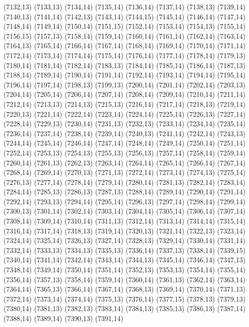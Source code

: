 (7132,13)
(7133,13)
(7134,14)
(7135,14)
(7136,14)
(7137,14)
(7138,13)
(7139,14)
(7140,13)
(7141,14)
(7142,13)
(7143,14)
(7144,15)
(7145,14)
(7146,14)
(7147,14)
(7148,14)
(7149,14)
(7150,14)
(7151,15)
(7152,14)
(7153,14)
(7154,13)
(7155,14)
(7156,15)
(7157,13)
(7158,14)
(7159,14)
(7160,14)
(7161,14)
(7162,14)
(7163,14)
(7164,13)
(7165,14)
(7166,14)
(7167,14)
(7168,14)
(7169,14)
(7170,14)
(7171,14)
(7172,14)
(7173,14)
(7174,14)
(7175,14)
(7176,14)
(7177,14)
(7178,14)
(7179,13)
(7180,14)
(7181,14)
(7182,14)
(7183,13)
(7184,14)
(7185,14)
(7186,14)
(7187,13)
(7188,14)
(7189,14)
(7190,14)
(7191,14)
(7192,14)
(7193,14)
(7194,14)
(7195,14)
(7196,14)
(7197,14)
(7198,13)
(7199,13)
(7200,14)
(7201,14)
(7202,14)
(7203,13)
(7204,14)
(7205,14)
(7206,14)
(7207,14)
(7208,14)
(7209,14)
(7210,14)
(7211,14)
(7212,14)
(7213,13)
(7214,13)
(7215,13)
(7216,14)
(7217,14)
(7218,13)
(7219,14)
(7220,13)
(7221,14)
(7222,14)
(7223,14)
(7224,14)
(7225,14)
(7226,13)
(7227,14)
(7228,14)
(7229,13)
(7230,14)
(7231,13)
(7232,13)
(7233,14)
(7234,14)
(7235,14)
(7236,14)
(7237,14)
(7238,14)
(7239,14)
(7240,13)
(7241,14)
(7242,14)
(7243,13)
(7244,14)
(7245,14)
(7246,14)
(7247,14)
(7248,14)
(7249,14)
(7250,14)
(7251,14)
(7252,14)
(7253,13)
(7254,13)
(7255,13)
(7256,13)
(7257,14)
(7258,14)
(7259,14)
(7260,14)
(7261,13)
(7262,13)
(7263,14)
(7264,14)
(7265,14)
(7266,14)
(7267,14)
(7268,14)
(7269,14)
(7270,13)
(7271,13)
(7272,14)
(7273,14)
(7274,13)
(7275,14)
(7276,13)
(7277,14)
(7278,14)
(7279,14)
(7280,14)
(7281,13)
(7282,14)
(7283,14)
(7284,14)
(7285,13)
(7286,13)
(7287,13)
(7288,14)
(7289,14)
(7290,14)
(7291,14)
(7292,14)
(7293,13)
(7294,14)
(7295,14)
(7296,13)
(7297,14)
(7298,14)
(7299,14)
(7300,13)
(7301,14)
(7302,14)
(7303,14)
(7304,14)
(7305,14)
(7306,14)
(7307,14)
(7308,14)
(7309,14)
(7310,14)
(7311,13)
(7312,14)
(7313,14)
(7314,14)
(7315,14)
(7316,14)
(7317,14)
(7318,13)
(7319,14)
(7320,13)
(7321,14)
(7322,13)
(7323,14)
(7324,14)
(7325,14)
(7326,13)
(7327,14)
(7328,13)
(7329,14)
(7330,14)
(7331,14)
(7332,14)
(7333,13)
(7334,13)
(7335,13)
(7336,14)
(7337,13)
(7338,14)
(7339,15)
(7340,14)
(7341,14)
(7342,14)
(7343,14)
(7344,13)
(7345,14)
(7346,14)
(7347,13)
(7348,14)
(7349,14)
(7350,14)
(7351,14)
(7352,13)
(7353,13)
(7354,14)
(7355,14)
(7356,14)
(7357,13)
(7358,14)
(7359,14)
(7360,14)
(7361,13)
(7362,14)
(7363,14)
(7364,14)
(7365,13)
(7366,14)
(7367,14)
(7368,13)
(7369,14)
(7370,14)
(7371,13)
(7372,14)
(7373,14)
(7374,14)
(7375,13)
(7376,14)
(7377,15)
(7378,13)
(7379,13)
(7380,14)
(7381,13)
(7382,13)
(7383,14)
(7384,13)
(7385,13)
(7386,13)
(7387,14)
(7388,14)
(7389,14)
(7390,13)
(7391,14)
